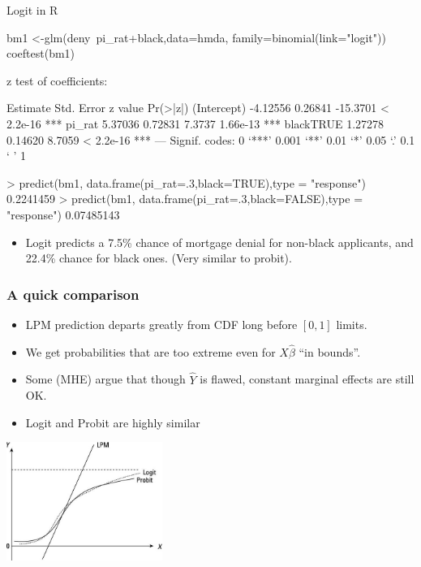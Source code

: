 \documentclass[aspectratio=169]{beamer}
\begin{document}
\begin{frame}[fragile]{Logit in R}
\footnotesize
\begin{semiverbatim}
bm1 <-glm(deny~pi_rat+black,data=hmda, family=binomial(link="logit"))
coeftest(bm1)

z test of coefficients:

            Estimate Std. Error  z value  Pr(>|z|)    
(Intercept) -4.12556    0.26841 -15.3701 < 2.2e-16 ***
pi_rat       5.37036    0.72831   7.3737  1.66e-13 ***
blackTRUE    1.27278    0.14620   8.7059 < 2.2e-16 ***
---
    Signif. codes:  0 `***' 0.001 `**' 0.01 `*' 0.05 `.' 0.1 ` ' 1

> predict(bm1, data.frame(pi_rat=.3,black=TRUE),type = "response")
0.2241459 
> predict(bm1, data.frame(pi_rat=.3,black=FALSE),type = "response")
0.07485143  
\end{semiverbatim}
\begin{itemize}
\item Logit predicts a 7.5\% chance of mortgage denial for non-black applicants, and 22.4\% chance for black ones. (Very similar to probit).
\end{itemize}
\end{frame}



\begin{frame}
\frametitle{A quick comparison}
\begin{itemize}
\item LPM prediction departs greatly from CDF long before $[0,1]$ limits.
\item We get probabilities that are too extreme even for $X\hat{\beta}$ ``in bounds''.
\item Some (MHE) argue that though $\hat{Y}$ is flawed, constant marginal effects are still OK.
\item Logit and Probit are highly similar
\end{itemize}
\begin{center}
\includegraphics[width=2in]{resources/lpm-probit.jpg}
\end{center}
\end{frame}
\end{document}
